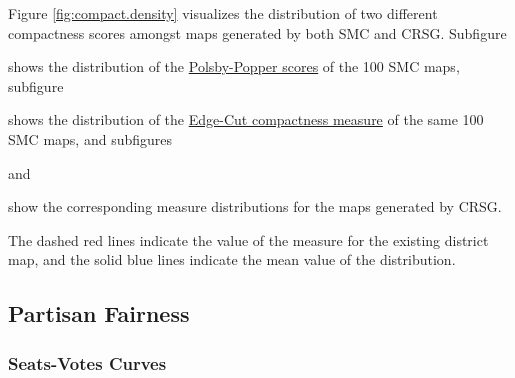 Figure \ref{fig:compact.density} visualizes the distribution of two different compactness scores amongst maps generated by both SMC and CRSG. Subfigure
\begin{seriate} 
    \item shows the distribution of the \hyperref[sec:polsbypopper]{Polsby-Popper scores} of the 100 SMC maps, subfigure
    \item shows the distribution of the \hyperref[sec:edgecut]{Edge-Cut compactness measure} of the same 100 SMC maps, and subfigures
    \item and 
    \item show the corresponding measure distributions for the maps generated by CRSG. 
\end{seriate}
The dashed red lines indicate the value of the measure for the existing district map, and the solid blue lines indicate the mean value of the distribution. 

\subsection{Partisan Fairness}

\subsubsection{Seats-Votes Curves}

